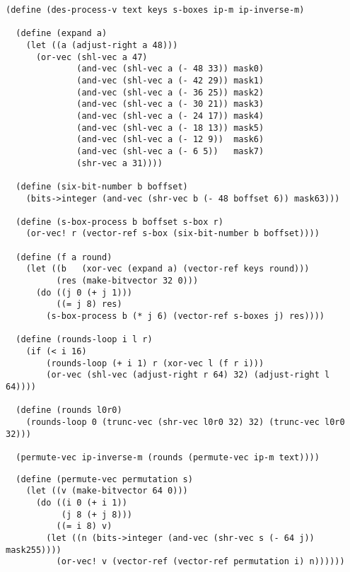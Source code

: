 
\topmargin      -1.0cm
\oddsidemargin  -1.0cm
\evensidemargin -1.0cm
\textwidth       8.0in
\textheight      11.0in



\Large
\begin{verbatim}
(define (des-process-v text keys s-boxes ip-m ip-inverse-m)

  (define (expand a)
    (let ((a (adjust-right a 48)))
      (or-vec (shl-vec a 47)
              (and-vec (shl-vec a (- 48 33)) mask0)
              (and-vec (shl-vec a (- 42 29)) mask1)
              (and-vec (shl-vec a (- 36 25)) mask2)
              (and-vec (shl-vec a (- 30 21)) mask3)
              (and-vec (shl-vec a (- 24 17)) mask4)
              (and-vec (shl-vec a (- 18 13)) mask5)
              (and-vec (shl-vec a (- 12 9))  mask6)
              (and-vec (shl-vec a (- 6 5))   mask7)
              (shr-vec a 31))))

  (define (six-bit-number b boffset)
    (bits->integer (and-vec (shr-vec b (- 48 boffset 6)) mask63)))

  (define (s-box-process b boffset s-box r)
    (or-vec! r (vector-ref s-box (six-bit-number b boffset))))

  (define (f a round)
    (let ((b   (xor-vec (expand a) (vector-ref keys round)))
          (res (make-bitvector 32 0)))
      (do ((j 0 (+ j 1)))
          ((= j 8) res)
        (s-box-process b (* j 6) (vector-ref s-boxes j) res))))

  (define (rounds-loop i l r)
    (if (< i 16)
        (rounds-loop (+ i 1) r (xor-vec l (f r i)))
        (or-vec (shl-vec (adjust-right r 64) 32) (adjust-right l 64))))

  (define (rounds l0r0)
    (rounds-loop 0 (trunc-vec (shr-vec l0r0 32) 32) (trunc-vec l0r0 32)))

  (permute-vec ip-inverse-m (rounds (permute-vec ip-m text))))
\end{verbatim}
\pagebreak
\begin{verbatim}
  (define (permute-vec permutation s)
    (let ((v (make-bitvector 64 0)))
      (do ((i 0 (+ i 1))
           (j 8 (+ j 8)))
          ((= i 8) v)
        (let ((n (bits->integer (and-vec (shr-vec s (- 64 j)) mask255))))
          (or-vec! v (vector-ref (vector-ref permutation i) n))))))
\end{verbatim}


